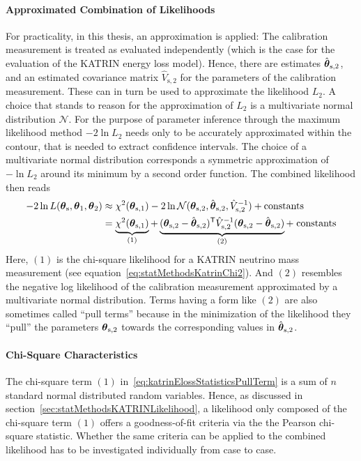 \paragraph{Approximated Combination of Likelihoods}
For practicality, in this thesis, an approximation is applied: The calibration measurement is treated as evaluated independently (which is the case for the evaluation of the KATRIN energy loss model). Hence, there are estimates $\hat{\boldsymbol{\mathbf{\theta}}}_\mathrm{s,2}$, and an estimated covariance matrix $\hat{V}_\mathrm{s,2}$ for the parameters of the calibration measurement. These can in turn be used to approximate the likelihood $L_2$. A choice that stands to reason for the approximation of $L_2$ is a multivariate normal distribution $\mathcal{N}$. For the purpose of parameter inference through the maximum likelihood method $-2\ln L_2$ needs only to be accurately approximated within the contour, that is needed to extract confidence intervals. The choice of a multivariate normal distribution corresponds a symmetric approximation of $-\ln L_2$ around its minimum by a second order function. The combined likelihood then reads
\begin{equation}
\begin{split}
\label{eq:katrinElossStatisticsPullTerm}
-2\ln L(\paramVecShared, \paramVec_1, \paramVec_2) &\approx
\chi^2(\paramVecSOne) 
-2\ln \mathcal{N}(\paramVecSTwo, \hat{\paramVec}_\mathrm{s,2}, \hat{V}_\mathrm{s,2}^{-1}) +
\mathrm{ constants}\\ &=
\underbrace{
	\chi^2(\paramVecSOne)
	\vphantom{(\paramVecSTwo - \hat{\paramVec}_\mathrm{s,2})^{\mathsf{T}}}
}_{(1)}
+
\underbrace{
	(\paramVec_\mathrm{s,2} - \hat{\paramVec}_\mathrm{s,2})^{\mathsf{T}}
	\hat{V}_\mathrm{s,2}^{-1}
	(\paramVec_\mathrm{s,2} - \hat{\paramVec}_\mathrm{s,2})
}_{(2)} +\; 
\mathrm{ constants}
\end{split}
\end{equation}
Here, $(1)$ is the chi-square likelihood for a KATRIN neutrino mass measurement (see equation~\ref{eq:statMethodsKatrinChi2}). And $(2)$ resembles the negative log likelihood of the calibration measurement approximated by a multivariate normal distribution. Terms having a form like $(2)$ are also sometimes called ``pull terms'' because in the minimization of the likelihood they ``pull'' the parameters $\boldsymbol{\mathbf{\theta}}_\mathrm{s,2}$ towards the corresponding values in $\hat{\boldsymbol{\mathbf{\theta}}}_\mathrm{s,2}$.

\paragraph{Chi-Square Characteristics}
The chi-square term $(1)$ in~\eqref{eq:katrinElossStatisticsPullTerm} is a sum of $n$ standard normal distributed random variables. Hence, as discussed in section~\ref{sec:statMethodsKATRINLikelihood}, a likelihood only composed of the chi-square term $(1)$ offers a goodness-of-fit criteria via the the Pearson chi-square statistic. Whether the same criteria can be applied to the combined likelihood has to be investigated individually from case to case.

